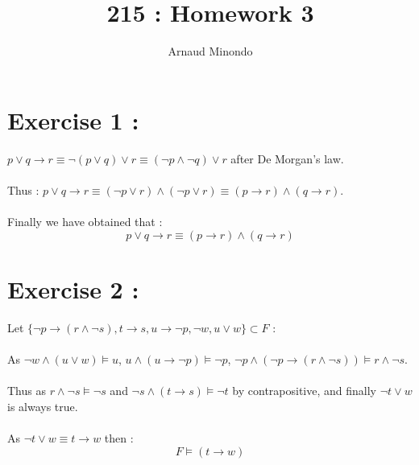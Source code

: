 \documentclass{article}
\title{215 : Homework 3}
\author{Arnaud Minondo}
\begin{document}
    \maketitle
    \section*{Exercise 1 :}
    $p\lor q \rightarrow r \equiv \lnot(p\lor q) \lor r \equiv (\lnot p \land \lnot q)\lor r$ after De Morgan's law.
    \\\\
    Thus : $p\lor q  \rightarrow r \equiv (\lnot p \lor r)\land (\lnot p\lor r)\equiv (p \rightarrow r) \land (q \rightarrow r)$.
    \\\\
    Finally we have obtained that : $$\boxed{p\lor q  \rightarrow r \equiv  (p \rightarrow r) \land (q \rightarrow r)}$$
    \section*{Exercise 2 :}
    Let $\{\lnot p \rightarrow (r\land \lnot s), t\rightarrow s, u\rightarrow \lnot p , \lnot w , u \lor w \} \subset F$ :
    \\\\
    As $\lnot w \land (u \lor w) \models u$, $u \land (u\rightarrow \lnot p) \models \lnot p$, $\lnot p \land (\lnot p \rightarrow (r\land \lnot s))\models r\land \lnot s$.
    \\\\
    Thus as $r\land \lnot s\models \lnot s$ and $\lnot s \land (t\rightarrow s) \models \lnot t $ by contrapositive, and finally $\lnot t \lor w$ is always true.
    \\\\
    As $\lnot t \lor w \equiv t\rightarrow w$ then : $$\boxed{F\models (t\rightarrow w)}$$
\end{document}

